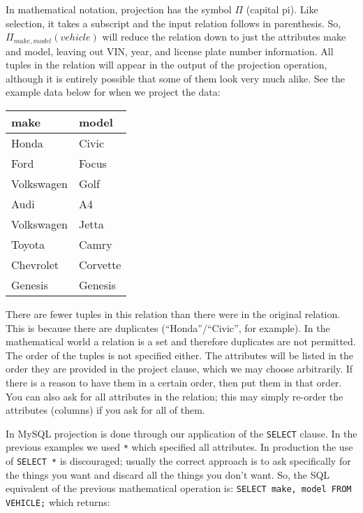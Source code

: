 In mathematical notation, projection has the symbol $\Pi$ (capital pi). Like selection, it takes a subscript and the input relation follows in parenthesis. So, $\Pi_{make, model}( vehicle )$ will reduce the relation down to just the attributes make and model, leaving out VIN, year, and license plate number information. All tuples in the relation will appear in the output of the projection operation, although it is entirely possible that some of them look very much alike. See the example data below for when we project the data:

\begin{center}
\begin{tabular}{|l|l|} \hline
\textbf{make} & \textbf{model} \\ \hline
	Honda & Civic \\ \hline
	Ford & Focus \\ \hline
	Volkswagen & Golf \\ \hline
	Audi & A4  \\ \hline
	Volkswagen & Jetta  \\ \hline
	Toyota & Camry \\ \hline
	Chevrolet & Corvette \\ \hline
	Genesis & Genesis \\ \hline
\end{tabular}
\end{center}

There are fewer tuples in this relation than there were in the original relation. This is because there are duplicates (``Honda''/``Civic'', for example). In the mathematical world a relation is a set and therefore duplicates are not permitted. The order of the tuples is not specified either. The attributes will be listed in the order they are provided in the project clause, which we may choose arbitrarily. If there is a reason to have them in a certain order, then put them in that order. You can also ask for all attributes in the relation; this may simply re-order the attributes (columns) if you ask for all of them.

In MySQL projection is done through our application of the \texttt{SELECT} clause. In the previous examples we used \texttt{*} which specified all attributes. In production the use of \texttt{SELECT *} is discouraged; usually the correct approach is to ask specifically for the things you want and discard all the things you don't want. So, the SQL equivalent of the previous mathematical operation is: \texttt{SELECT make, model FROM VEHICLE;} which returns:

